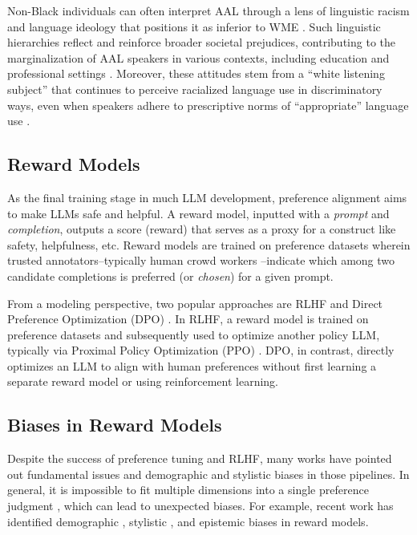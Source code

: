 Non-Black individuals can often interpret AAL through a lens of linguistic racism and language ideology that positions it as inferior to WME \cite{spears1998}. Such linguistic hierarchies reflect and reinforce broader societal prejudices, contributing to the marginalization of AAL speakers in various contexts, including education and professional settings \cite{alim2016}. Moreover, these attitudes stem from a ``white listening subject'' that continues to perceive racialized language use in discriminatory ways, even when speakers adhere to prescriptive norms of ``appropriate'' language use \cite{spears1998, alim2016, rosa_unsettling_2017}.


\subsection{Reward Models}
As the final training stage in much LLM development, preference alignment aims to make LLMs safe and helpful. A reward model, inputted with a \textit{prompt} and \textit{completion}, outputs a score (reward) that serves as a proxy for a construct like safety, helpfulness, etc. Reward models are trained on preference datasets wherein trusted annotators--typically human crowd workers \citep{bai_training_2022, wang_helpsteer_2023}--indicate which among two candidate completions is preferred (or \textit{chosen}) for a given prompt.

From a modeling perspective, two popular approaches are RLHF \citep{christiano_deep_2017, ouyang_training_2022} and Direct Preference Optimization (DPO) \cite{rafailov_direct_2024}. In RLHF, a reward model is trained on preference datasets and subsequently used to optimize another policy LLM, typically via Proximal Policy Optimization (PPO) \cite{schulman_proximal_2017}. DPO, in contrast, directly optimizes an LLM to align with human preferences without first learning a separate reward model or using reinforcement learning. 

\subsection{Biases in Reward Models}
Despite the success of preference tuning and RLHF, many works have pointed out fundamental issues and demographic and stylistic biases in those pipelines. In general, it is impossible to fit multiple dimensions into a single preference judgment \cite{casper2023open}, which can lead to unexpected biases. For example, recent work has identified demographic \cite{ryan-etal-2024-unintended}, stylistic \citep{singhal_long_2023}, and epistemic biases \citep{zhou2024relying} in reward models. 

